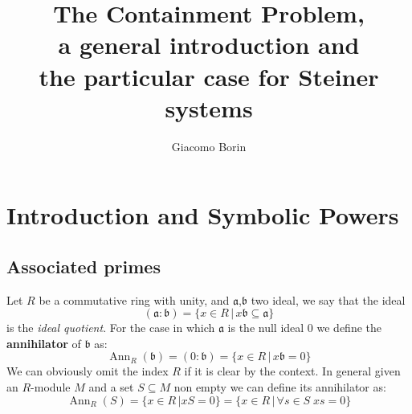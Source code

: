 \documentclass[a4wide]{book}
\title{The Containment Problem, 
\\a general introduction and 
\\the particular case for Steiner systems}
\author{Giacomo Borin}
\theoremstyle{plain}
\theoremstyle{remark}
\theoremstyle{definition}
\newcommand{\A}{\mathfrak{a}}
\newcommand{\B}{\mathfrak{b}}
\DeclareMathOperator{\Ann}{Ann}
\begin{document}
\frontmatter
\maketitle

\UCTfalse
\tableofcontents


\mainmatter





\chapter{Introduction and Symbolic Powers}


\section{Associated primes}

Let $ R $ be a commutative ring with unity, and $ \A $,$ \B $ two ideal, we say that the ideal
\begin{equation*}
	(\A : \B) = \{ x \in R \,|\, x\B \subseteq \A  \}
\end{equation*}
 \nocite{AMCD}
is the \textit{ideal quotient}. For the case in which $ \A $  is the null ideal $ 0 $ we define the \textbf{annihilator} of $ \B $ as:
\begin{equation*}
	\Ann_R(\B) = (0 : \B) = \{ x \in R \,|\, x\B = 0  \}
\end{equation*}
We can obviously omit the index $ R $ if it is clear by the context. In general given an $ R  $-module $ M $ and a set $ S \subseteq M $ non empty we can define its annihilator as:
\begin{equation*}
	\Ann_R (S) = \{ x \in R \,| xS = 0  \} = \{ x \in R \,|\, \forall s \in S \; xs = 0  \}
\end{equation*}
\end{document}

